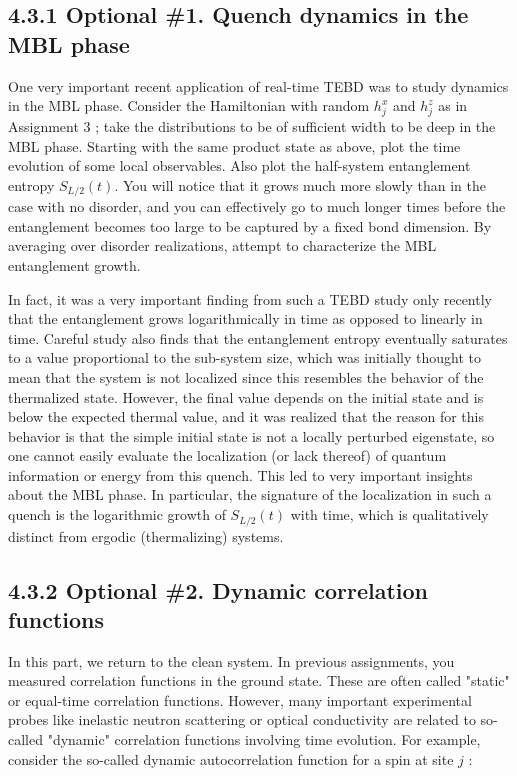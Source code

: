 \documentclass[12pt]{article}
\begin{document}
\subsection*{4.3.1 Optional \#1. Quench dynamics in the MBL phase}
One very important recent application of real-time TEBD was to study dynamics in the MBL phase. Consider the Hamiltonian with random $h_{j}^{x}$ and $h_{j}^{z}$ as in Assignment 3 ; take the distributions to be of sufficient width to be deep in the MBL phase. Starting with the same product state as above, plot the time evolution of some local observables. Also plot the half-system entanglement entropy $S_{L / 2}(t)$. You will notice that it grows much more slowly than in the case with no disorder, and you can effectively go to much longer times before the entanglement becomes too large to be captured by a fixed bond dimension. By averaging over disorder realizations, attempt to characterize the MBL entanglement growth.

In fact, it was a very important finding from such a TEBD study only recently that the entanglement grows logarithmically in time as opposed to linearly in time. Careful study also finds that the entanglement entropy eventually saturates to a value proportional to the sub-system size, which was initially thought to mean that the system is not localized since this resembles the behavior of the thermalized state. However, the final value depends on the initial state and is below the expected thermal value, and it was realized that the reason for this behavior is that the simple initial state is not a locally perturbed eigenstate, so one cannot easily evaluate the localization (or lack thereof) of quantum information or energy from this quench. This led to very important insights about the MBL phase. In particular, the signature of the localization in such a quench is the logarithmic growth of $S_{L / 2}(t)$ with time, which is qualitatively distinct from ergodic (thermalizing) systems.

\subsection*{4.3.2 Optional \#2. Dynamic correlation functions}
In this part, we return to the clean system. In previous assignments, you measured correlation functions in the ground state. These are often called "static" or equal-time correlation functions. However, many important experimental probes like inelastic neutron scattering or optical conductivity are related to so-called "dynamic" correlation functions involving time evolution. For example, consider the so-called dynamic autocorrelation function for a spin at site $j$ :
\end{document}
